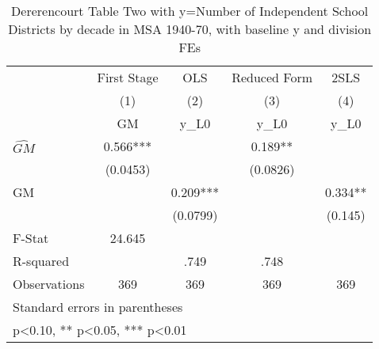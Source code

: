 \begin{table}[htbp]\centering
\def\sym#1{\ifmmode^{#1}\else\(^{#1}\)\fi}
\caption{Dererencourt Table Two with y=Number of Independent School Districts by decade in MSA 1940-70, with baseline y and division FEs}
\begin{tabular}{l*{4}{c}}
\toprule
                    & First Stage   &         OLS   &Reduced Form   &        2SLS   \\
                    &\multicolumn{1}{c}{(1)}&\multicolumn{1}{c}{(2)}&\multicolumn{1}{c}{(3)}&\multicolumn{1}{c}{(4)}\\
                    &\multicolumn{1}{c}{GM}&\multicolumn{1}{c}{y\_L0}&\multicolumn{1}{c}{y\_L0}&\multicolumn{1}{c}{y\_L0}\\
\midrule
$\hat{GM}$          &       0.566***&               &       0.189** &               \\
                    &    (0.0453)   &               &    (0.0826)   &               \\
\addlinespace
GM                  &               &       0.209***&               &       0.334** \\
                    &               &    (0.0799)   &               &     (0.145)   \\
\midrule
F-Stat              &      24.645   &               &               &               \\
R-squared           &               &        .749   &        .748   &               \\
Observations        &         369   &         369   &         369   &         369   \\
\bottomrule
\multicolumn{5}{l}{\footnotesize Standard errors in parentheses}\\
\multicolumn{5}{l}{\footnotesize * p<0.10, ** p<0.05, *** p<0.01}\\
\end{tabular}
\end{table}
